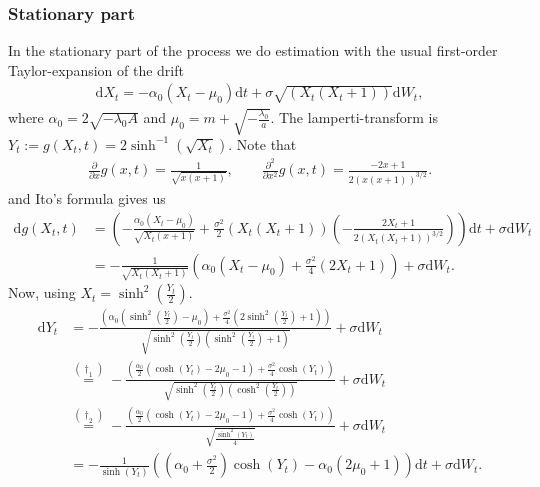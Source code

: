 \subsubsection{Stationary part}
In the stationary part of the process we do estimation with the usual first-order Taylor-expansion of the drift
\begin{align}
    \mathrm{d}X_t = -\alpha_0\left(X_t - \mu_0\right)\mathrm{d}t + \sigma \sqrt{\left(X_t\left(X_t + 1\right)\right)}\mathrm{d}W_t,
\end{align}
where $\alpha_0 = 2\sqrt{-\lambda_0 A}$ and $\mu_0 = m + \sqrt{-\frac{\lambda_0}{a}}$.
The lamperti-transform is $Y_t := g(X_t, t) = 2 \sinh^{-1}\left(\sqrt{X_t}\right)$. Note that
\begin{align}
    \frac{\partial}{\partial x}g(x, t) = \frac{1}{\sqrt{x\left(x + 1\right)}}, \qquad \frac{\partial^2}{\partial x^2}g(x, t) = \frac{-2x + 1}{2\left(x\left(x + 1\right)\right)^{3/2}}.
\end{align}
and Ito's formula gives us
\begin{align}
    \mathrm{d}g(X_t, t) &= \left(-\frac{\alpha_0\left(X_t - \mu_0\right)}{\sqrt{X_t\left(x + 1\right)}} + \frac{\sigma^2}{2}\left(X_t\left(X_t + 1\right)\right)\left(-\frac{2X_t + 1}{2\left(X_t\left(X_t + 1\right)\right)^{3/2}}\right)\right)\mathrm{d}t + \sigma\mathrm{d}W_t \nonumber\\
    &= -\frac{1}{\sqrt{X_t\left(X_t + 1\right)}}\left(\alpha_0\left(X_t - \mu_0\right) + \frac{\sigma^2}{4}\left(2X_t + 1\right)\right) + \sigma\mathrm{d}W_t.
\end{align}
Now, using $X_t = \sinh^2\left(\frac{Y_t}{2}\right)$.
\begin{align}
    \mathrm{d}Y_t &=  -\frac{\left(\alpha_0\left(\sinh^2\left(\frac{Y_t}{2}\right) - \mu_0\right) + \frac{\sigma^2}{4}\left(2\sinh^2\left(\frac{Y_t}{2}\right) + 1\right)\right)}{\sqrt{\sinh^2\left(\frac{Y_t}{2}\right)\left(\sinh^2\left(\frac{Y_t}{2}\right) + 1\right)}} + \sigma\mathrm{d}W_t \nonumber \\
     &\overset{\left(\dagger_1\right)}{=} -\frac{\left(\frac{\alpha_0}{2}\left(\cosh(Y_t) - 2\mu_0 - 1\right)+\frac{\sigma^2}{4}\cosh(Y_t)\right)}{\sqrt{\sinh^2\left(\frac{Y_t}{2}\right)\left(\cosh^2\left(\frac{Y_t}{2}\right)\right)}} + \sigma\mathrm{d}W_t \nonumber \\
     &\overset{(\dagger_2)}{=} -\frac{\left(\frac{\alpha_0}{2}\left(\cosh(Y_t) - 2\mu_0 - 1\right)+\frac{\sigma^2}{4}\cosh(Y_t)\right)}{\sqrt{\frac{\sinh^2(Y_t)}{4}}} + \sigma\mathrm{d}W_t \nonumber \\
     &= - \frac{1}{\sinh(Y_t)}\left(\left(\alpha_0 + \frac{\sigma^2}{2}\right)\cosh(Y_t) - \alpha_0\left(2\mu_0 + 1\right)\right) \mathrm{d}t + \sigma \mathrm{d}W_t. \label{eq:F_diffusion_lamperti_SDE}
\end{align}

